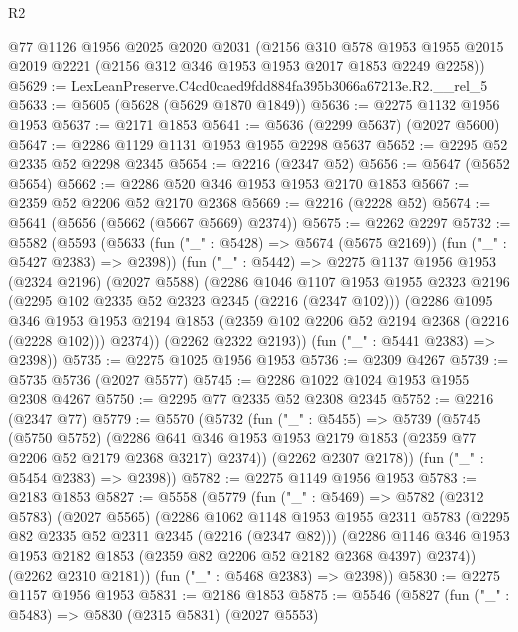 \begin{lexlean}{R2}
\begin{coremodule}
    @77
    @1126
    @1956
    @2025
    @2020
    @2031
    (@2156
      @310
      @578
      @1953
      @1955
      @2015
      @2019
      @2221
      (@2156 @312 @346 @1953 @1953 @2017 @1853 @2249 @2258))
@5629 := LexLeanPreserve.C4cd0caed9fdd884fa395b3066a67213e.R2.__rel_5
@5633 := @5605 (@5628 (@5629 @1870 @1849))
@5636 := @2275 @1132 @1956 @1953
@5637 := @2171 @1853
@5641 := @5636 (@2299 @5637) (@2027 @5600)
@5647 := @2286 @1129 @1131 @1953 @1955 @2298 @5637
@5652 := @2295 @52 @2335 @52 @2298 @2345
@5654 := @2216 (@2347 @52)
@5656 := @5647 (@5652 @5654)
@5662 := @2286 @520 @346 @1953 @1953 @2170 @1853
@5667 := @2359 @52 @2206 @52 @2170 @2368
@5669 := @2216 (@2228 @52)
@5674 := @5641 (@5656 (@5662 (@5667 @5669) @2374))
@5675 := @2262 @2297
@5732 := @5582
    (@5593
      (@5633 (fun ("_" : @5428) => @5674 (@5675 @2169)) (fun ("_" : @5427 @2383) => @2398))
      (fun ("_" : @5442) =>
      @2275
        @1137
        @1956
        @1953
        (@2324 @2196)
        (@2027 @5588)
        (@2286
          @1046
          @1107
          @1953
          @1955
          @2323
          @2196
          (@2295 @102 @2335 @52 @2323 @2345 (@2216 (@2347 @102)))
          (@2286
            @1095
            @346
            @1953
            @1953
            @2194
            @1853
            (@2359 @102 @2206 @52 @2194 @2368 (@2216 (@2228 @102)))
            @2374))
        (@2262 @2322 @2193))
      (fun ("_" : @5441 @2383) => @2398))
@5735 := @2275 @1025 @1956 @1953
@5736 := @2309 @4267
@5739 := @5735 @5736 (@2027 @5577)
@5745 := @2286 @1022 @1024 @1953 @1955 @2308 @4267
@5750 := @2295 @77 @2335 @52 @2308 @2345
@5752 := @2216 (@2347 @77)
@5779 := @5570
    (@5732
      (fun ("_" : @5455) =>
      @5739
        (@5745
          (@5750 @5752)
          (@2286 @641 @346 @1953 @1953 @2179 @1853 (@2359 @77 @2206 @52 @2179 @2368 @3217) @2374))
        (@2262 @2307 @2178))
      (fun ("_" : @5454 @2383) => @2398))
@5782 := @2275 @1149 @1956 @1953
@5783 := @2183 @1853
@5827 := @5558
    (@5779
      (fun ("_" : @5469) =>
      @5782
        (@2312 @5783)
        (@2027 @5565)
        (@2286
          @1062
          @1148
          @1953
          @1955
          @2311
          @5783
          (@2295 @82 @2335 @52 @2311 @2345 (@2216 (@2347 @82)))
          (@2286 @1146 @346 @1953 @1953 @2182 @1853 (@2359 @82 @2206 @52 @2182 @2368 @4397) @2374))
        (@2262 @2310 @2181))
      (fun ("_" : @5468 @2383) => @2398))
@5830 := @2275 @1157 @1956 @1953
@5831 := @2186 @1853
@5875 := @5546
    (@5827
      (fun ("_" : @5483) =>
      @5830
        (@2315 @5831)
        (@2027 @5553)

\end{coremodule}
\end{lexlean}

